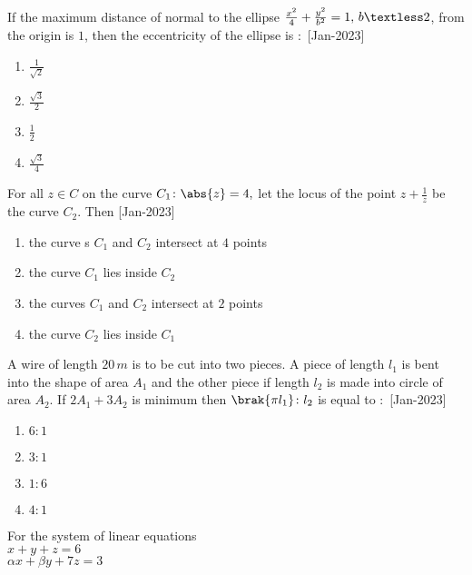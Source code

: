 \iffalse
\title{2023}
\author{EE24BTECH11021}
\section{mcq-single}
\fi
    \item If the maximum distance of  normal to the ellipse $\frac{x^2}{4}+\frac{y^2}{b^2}=1,\,b\textless 2$, from the origin is $1$, then the eccentricity of the ellipse is $\colon$
    \hfill{[Jan-2023]}
        \begin{enumerate}
            \item $\frac{1}{\sqrt{2}}$
            \item $\frac{\sqrt{3}}{2}$
            \item $\frac{1}{2}$
            \item $\frac{\sqrt{3}}{4}$
        \end{enumerate}
    \item For all $z\in C$ on the curve $C_1\colon\abs{z}=4,$ let the locus of the point $z+\frac{1}{z}$ be the curve $C_2$. Then 
    \hfill{[Jan-2023]}
        \begin{enumerate}
            \item the curve s $C_1$ and  $C_2$ intersect at $4$ points
            \item the curve $C_1$ lies inside $C_2$
            \item the curves $C_1$ and $C_2$ intersect at $2$ points
            \item the curve $C_2$ lies inside $C_1$ 
        \end{enumerate}
    \item A wire of length $20\,m$ is to be cut into two pieces. A piece of length $l_1$ is bent into the shape of area $A_1$ and the other piece if length $l_2$ is made into circle of area $A_2$. If $2A_1+3A_2$ is minimum then $\brak{\pi l_1}\colon l_2$ is equal to $\colon$
    \hfill{[Jan-2023]}
        \begin{enumerate}
            \item $6\colon1$
            \item $3\colon1$
            \item $1\colon6$
            \item $4\colon1$
        \end{enumerate}
    \item For the system of linear equations\\
            $x+y+z=6$\\
            $\alpha x+\beta y+7z=3$\\
